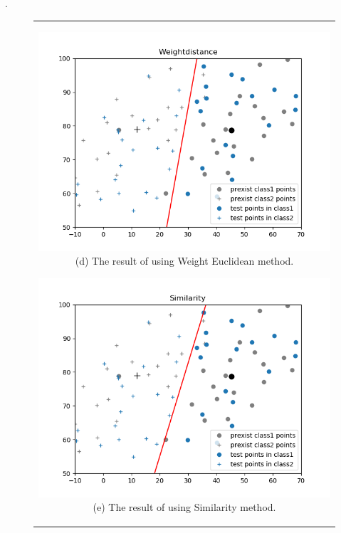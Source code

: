 \documentclass[10.5pt]{jsarticle}
\begin{document}
.\\
\begin{figure}[htbp]
  \centering
  \begin{tabular}{c}
  	\begin{minipage}{0.56\hsize}
  	\centering
  		\includegraphics[width=15.0cm, bb=9 9 700 270]{results/WeightdistanceResultFigureA.png}
  		\hspace{0cm} (d) The result of using Weight Euclidean method.
  	\end{minipage}

  	\begin{minipage}{0.5\hsize}
  	\centering
  		\includegraphics[width=15.0cm, bb=9 9 700 270]{results/SimilarityResultFigureA.png}
  		\hspace{0cm} (e) The result of using Similarity method.
  	\end{minipage}
  \end{tabular}
\end{figure}
\end{document}
